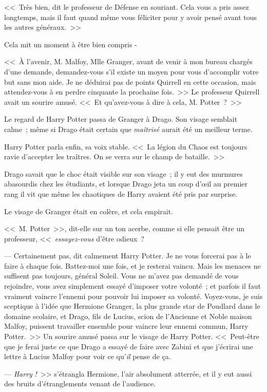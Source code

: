 <<~Très bien, dit le professeur de Défense en souriant. Cela vous a pris assez longtemps, mais il faut quand même vous féliciter pour y avoir pensé avant tous les autres généraux.~>>

Cela mit un moment à être bien compris -

<<~À l'avenir, M. Malfoy, Mlle Granger, avant de venir à mon bureau chargés d'une demande, demandez-vous s'il existe un moyen pour vous d'accomplir votre but sans mon aide. Je ne déduirai pas de points Quirrell en cette occasion, mais attendez-vous à en perdre cinquante la prochaine fois.~>> Le professeur Quirrell avait un sourire amusé. <<~Et qu'avez-vous à dire à cela, M. Potter~?~>>

Le regard de Harry Potter passa de Granger à Drago. Son visage semblait calme~; même si Drago était certain que \emph{maîtrisé} aurait été un meilleur terme.

Harry Potter parla enfin, sa voix stable. <<~La légion du Chaos est toujours ravie d'accepter les traîtres. On se verra sur le champ de bataille.~>>

Drago savait que le choc était visible sur son visage~; il y eut des murmures abasourdis chez les étudiants, et lorsque Drago jeta un coup d'œil au premier rang il vit que même les chaotiques de Harry avaient été pris par surprise.

Le visage de Granger était en colère, et cela empirait.

<<~M. Potter~>>, dit-elle sur un ton acerbe, comme si elle pensait être un professeur, <<~\emph{essayez-vous} d'être odieux~?

--- Certainement pas, dit calmement Harry Potter. Je ne vous forcerai pas à le faire à chaque fois. Battez-moi une fois, et je resterai vaincu. Mais les menaces ne suffisent pas toujours, général Soleil. Vous ne m'avez pas demandé de vous rejoindre, vous avez simplement essayé d'imposer votre volonté~; et parfois il faut vraiment vaincre l'ennemi pour pouvoir lui imposer sa volonté. Voyez-vous, je suis sceptique à l'idée que Hermione Granger, la plus grande star de Poudlard dans le domaine scolaire, et Drago, fils de Lucius, scion de l'Ancienne et Noble maison Malfoy, puissent travailler ensemble pour vaincre leur ennemi commun, Harry Potter.~>> Un sourire amusé passa sur le visage de Harry Potter. <<~Peut-être que je ferai juste ce que Drago a essayé de faire avec Zabini et que j'écrirai une lettre à Lucius Malfoy pour voir ce qu'\emph{il} pense de ça.

--- \emph{Harry} \emph{!}~>> s'étrangla Hermione, l'air absolument atterrée, et il y eut aussi des bruits d'étranglements venant de l'audience.


